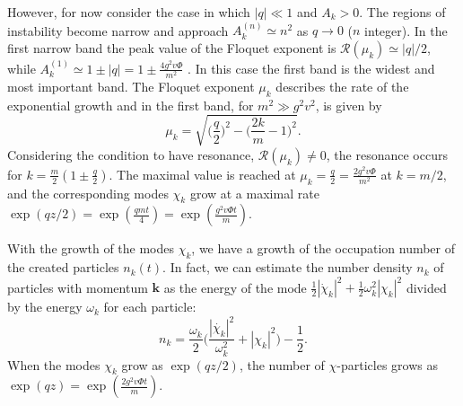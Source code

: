 \documentclass[11pt,a4paper,twoside]{book}
\begin{document}
However, for now consider the case in which $ |q|\ll 1 $ and $ A_{k}> 0$. The regions of instability become narrow and approach $ A_{k}^{(n)}\simeq n^{2} $ as $ q\rightarrow 0 $ ($ n  $ integer). In the first narrow band the peak value of the Floquet exponent is $ \mathcal{R}(\mu_{k}) \simeq |q|/2 $, while $ A_{k}^{(1)} \simeq 1 \pm |q| = 1 \pm \frac{4g^{2}v\Phi}{m^{2}} $ \cite{Chap4:Mechanics}. In this case  the first band is the widest and most important band. The Floquet exponent $\mu_{k}$ describes the rate of the exponential growth and in the first band, for $ m^{2} \gg g^{2}v^{2} $, is given by \cite{Chap4:LindePreheatingModel}
\begin{equation}
	\label{Chap4:FloquetExponent}
	\mu_{k}=\sqrt{\Bigg(\frac{q}{2}\Bigg)^{2} - \Bigg(\frac{2k}{m}-1\Bigg)^{2}}.
\end{equation}
Considering the condition to have resonance, $\mathcal{R}(\mu_{k}) \neq 0$, the resonance occurs for $ k=\frac{m}{2}(1 \pm \frac{q}{2}) $. The maximal value is reached at $\mu_{k}=\frac{q}{2}=\frac{2g^{2}v\Phi}{m^{2}}$ at $ k=m/2 $, and the corresponding modes $ \chi_{k} $ grow at a maximal rate $ \exp(qz/2)=\exp(\frac{qmt}{4})=\exp(\frac{g^{2}v\Phi t}{m}) $. 

With the growth of the modes $ \chi_{k} $, we have a growth of the occupation number of the created particles $ n_{k}(t) $. In fact, we can estimate the number density $ n_{k} $ of particles with momentum $ \textbf{k} $ as the energy of the mode $ \frac{1}{2}|\dot{\chi}_{k}|^{2} + \frac{1}{2}\omega_{k}^{2}|\chi_{k}|^{2} $ divided by the energy $ \omega_{k} $ for each particle:
\begin{equation}
n_{k}=\frac{\omega_{k}}{2}\Bigg(\frac{|\dot{\chi_{k}}|^{2}}{\omega_{k}^{2}} + |\chi_{k}|^{2}\Bigg) - \frac{1}{2}.
\end{equation}
When the modes $ \chi_{k} $ grow as  $\exp(qz/2) $, the number of $ \chi $-particles grows as $ \exp(qz)= \exp(\frac{2g^{2}v\Phi t}{m}) $.
\end{document}
